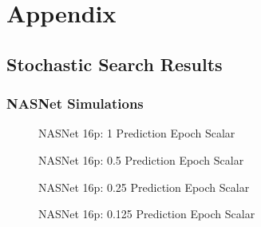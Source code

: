 \documentclass[twocolumn]{article}
\begin{document}
\FloatBarrier


\FloatBarrier
\appendix
\section{Appendix}

\subsection{Stochastic Search Results}
\clearpage
\subsubsection{NASNet Simulations}

\begin{figure}[!h]
    \begin{center}
        \resizebox{0.9\columnwidth}{!}{
             
        }
        \caption{NASNet 16p: 1 Prediction Epoch Scalar}
        \label{fig:nasnet_1x_acceleration}
    \end{center}
\end{figure}

\begin{figure}[!h]
    \begin{center}
        \resizebox{0.95\columnwidth}{!}{
             
        }
        \caption{NASNet 16p: 0.5 Prediction Epoch Scalar}
        \label{fig:nasnet_2x_acceleration}
    \end{center}
\end{figure}
        
\begin{figure}[!h]
    \begin{center}
        \resizebox{0.95\columnwidth}{!}{
            
        }
        \caption{NASNet 16p: 0.25 Prediction Epoch Scalar}
        \label{fig:nasnet_4x_acceleration}
    \end{center}
\end{figure}

\begin{figure}[!h]
    \begin{center}
        \resizebox{0.95\columnwidth}{!}{
            
        }
        \caption{NASNet 16p: 0.125 Prediction Epoch Scalar}
        \label{fig:nasnet_8x_acceleration}
    \end{center}
\end{figure}
\end{document}

